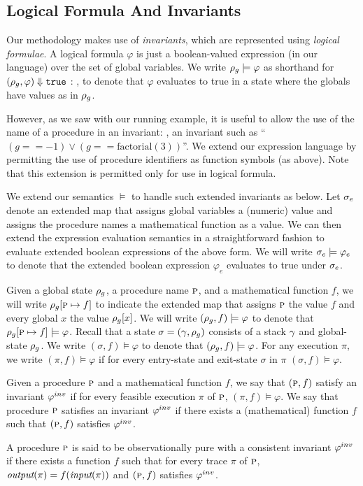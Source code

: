\subsection*{Logical Formula And Invariants}

Our methodology makes use of \emph{invariants}, which are represented using \emph{logical formulae}.
A  logical formula $\varphi$ is just a boolean-valued expression (in our language) over the set of global variables.
We write $\rho_g \models \varphi$ as shorthand for $({\rho_g},{\varphi}) \Downarrow {\texttt{true}}$ :
\ie, to denote that $\varphi$ evaluates to true in a state where the globals have values as in $\rho_g$.

However, as we saw with our running example, it is useful to allow the use of the name of a procedure in
an invariant: \eg, an invariant such as ``$(g == -1) \vee (g == \text{factorial}(3))$''.
We extend our expression language by permitting the use of procedure identifiers as
function symbols (as above). Note that this extension is permitted only for use in logical
formula.

We extend our semantics $\models$ to handle such extended invariants as below.
Let $\sigma_e$ denote an extended map that assigns global variables a (numeric) value and assigns the
procedure names a mathematical function as a value. We can then extend the expression evaluation semantics
in a straightforward fashion to evaluate extended boolean expressions of the above form. 
We will write $\sigma_e \models \varphi_e$ to denote that the extended boolean expression $\varphi_e$
evaluates to true under $\sigma_e$.

Given a global state $\rho_g$, a procedure name $\textsc{p}$, and a mathematical function $f$, we will write
$\rho_g[\textsc{p} \mapsto f]$ to indicate the extended map that assigns $\textsc{p}$ the value $f$ and every
global $x$ the value $\rho_g[x]$.
We will write $(\rho_g,f) \models \varphi$ to denote that $\rho_g[\textsc{p} \mapsto f] \models \varphi$.
Recall that a state $\sigma =(\gamma,\rho_g)$ consists of a stack $\gamma$ and global-state $\rho_g$.
We write $(\sigma,f) \models \varphi$ to denote that $(\rho_g,f) \models \varphi$.
For any execution $\pi$, we write $(\pi,f) \models \varphi$ if for every entry-state and exit-state
$\sigma$ in $\pi$ $(\sigma,f) \models \varphi$.


\begin{definition}[Invariant]
Given a procedure $\textsc{p}$ and a mathematical function $f$, we say that $(\textsc{p},f)$ satisfy
an invariant $\varphi^{inv}$ if for every feasible execution $\pi$ of $\textsc{p}$, $(\pi,f) \models \varphi$.
We say that procedure $\textsc{p}$ satisfies an invariant $\varphi^{inv}$ if there exists a (mathematical)
function $f$ such that $(\textsc{p},f)$ satisfies $\varphi^{inv}$.
\end{definition}

\begin{definition}
A procedure $\textsc{p}$ is said to be observationally pure with a consistent invariant $\varphi^{inv}$ if
there exists a function $f$ such that for every trace $\pi$ of $\textsc{p}$,
$\textit{output}(\pi) = f(\textit{input}(\pi))$ and $(\textsc{p},f)$ satisfies $\varphi^{inv}$.
\end{definition}